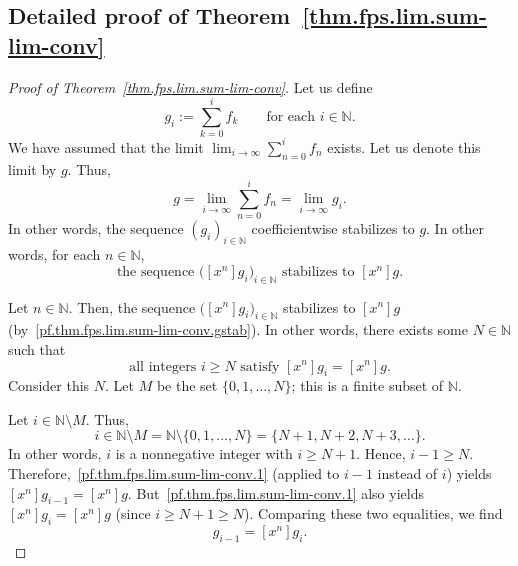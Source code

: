 \subsection{Detailed proof of Theorem~\ref{thm.fps.lim.sum-lim-conv}}

\begin{proof}[Proof of Theorem~\ref{thm.fps.lim.sum-lim-conv}]
\leanok
Let us define
\begin{equation}
g_i := \sum_{k=0}^{i} f_k
\qquad\text{for each } i\in\mathbb{N}.
\label{pf.thm.fps.lim.sum-lim-conv.gi}
\end{equation}
We have assumed that the limit $\lim_{i\to\infty} \sum_{n=0}^{i} f_n$
exists. Let us denote this limit by $g$. Thus,
\begin{equation}
g = \lim_{i\to\infty} \sum_{n=0}^{i} f_n
= \lim_{i\to\infty} g_i.
\label{pf.thm.fps.lim.sum-lim-conv.g=lim}
\end{equation}
In other words, the sequence $(g_i)_{i\in\mathbb{N}}$ coefficientwise
stabilizes to $g$. In other words, for each $n\in\mathbb{N}$,
\begin{equation}
\text{the sequence } \bigl([x^n] g_i\bigr)_{i\in\mathbb{N}}
\text{ stabilizes to } [x^n] g.
\label{pf.thm.fps.lim.sum-lim-conv.gstab}
\end{equation}

Let $n\in\mathbb{N}$. Then, the sequence
$\bigl([x^n] g_i\bigr)_{i\in\mathbb{N}}$ stabilizes to $[x^n] g$
(by~\eqref{pf.thm.fps.lim.sum-lim-conv.gstab}). In other words, there
exists some $N\in\mathbb{N}$ such that
\begin{equation}
\text{all integers } i\geq N \text{ satisfy }
[x^n] g_i = [x^n] g.
\label{pf.thm.fps.lim.sum-lim-conv.1}
\end{equation}
Consider this $N$. Let $M$ be the set $\{0,1,\ldots,N\}$; this is a
finite subset of $\mathbb{N}$.

Let $i\in\mathbb{N}\setminus M$. Thus,
\[
i\in\mathbb{N}\setminus M = \mathbb{N}\setminus\{0,1,\ldots,N\}
= \{N+1, N+2, N+3, \ldots\}.
\]
In other words, $i$ is a nonnegative integer with $i\geq N+1$. Hence,
$i-1\geq N$.
Therefore,~\eqref{pf.thm.fps.lim.sum-lim-conv.1} (applied to $i-1$
instead of $i$) yields $[x^n] g_{i-1} = [x^n] g$.
But~\eqref{pf.thm.fps.lim.sum-lim-conv.1} also yields
$[x^n] g_i = [x^n] g$ (since $i\geq N+1\geq N$). Comparing these two
equalities, we find
\begin{equation}
[x^n] g_{i-1} = [x^n] g_i.
\label{pf.thm.fps.lim.sum-lim-conv.2}
\end{equation}


\end{proof}
